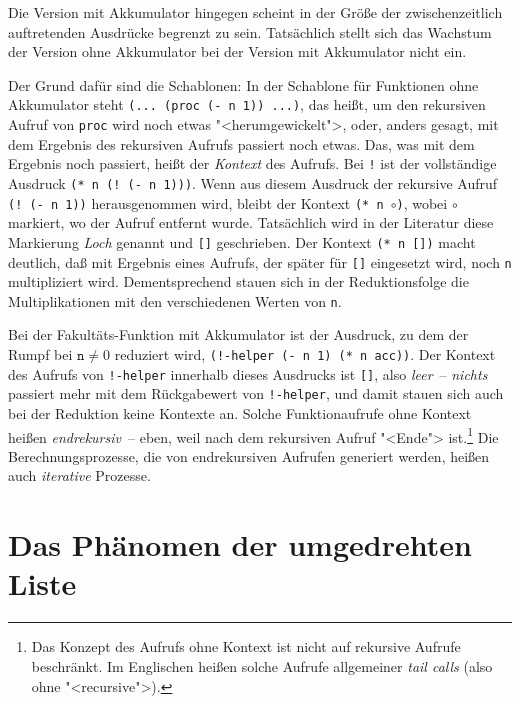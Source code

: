 Die Version mit Akkumulator hingegen scheint in der Größe der
zwischenzeitlich auftretenden Ausdrücke begrenzt zu sein.  Tatsächlich
stellt sich das Wachstum der Version ohne Akkumulator bei der Version
mit Akkumulator nicht ein.

Der Grund dafür sind die Schablonen: In der Schablone für Funktionen
ohne Akkumulator steht \texttt{(... (proc (- n 1)) ...)}, das
heißt, um den rekursiven Aufruf von \texttt{proc} wird noch
etwas "<herumgewickelt">, oder, anders gesagt, mit dem Ergebnis des
rekursiven Aufrufs passiert noch etwas.  Das, was mit dem Ergebnis
noch passiert, heißt der \textit{Kontext} des Aufrufs.
Bei \texttt{!} ist der vollständige Ausdruck \texttt{(* n (! (- n
  1)))}.  Wenn aus diesem Ausdruck der rekursive Aufruf \texttt{(! (-
  n 1))} herausgenommen wird, bleibt der Kontext \texttt{(* n
  \(\circ\))}, wobei $\circ$ markiert, wo der Aufruf entfernt
wurde.  Tatsächlich wird in der Literatur diese Markierung
\textit{Loch} genannt und \texttt{[]} geschrieben.  Der
Kontext \texttt{(* n [])} macht deutlich, daß mit Ergebnis eines
Aufrufs, der später für \texttt{[]} eingesetzt wird, noch \texttt{n}
multipliziert wird.  Dementsprechend stauen sich in der
Reduktionsfolge die Multiplikationen mit den verschiedenen Werten von
\texttt{n}.

Bei der Fakultäts-Funktion mit Akkumulator ist der Ausdruck, zu dem
der Rumpf bei $\texttt{n} \neq 0$ reduziert wird, \texttt{(!-helper (- n 1)
  (* n acc))}.  Der Kontext des Aufrufs von \texttt{!-helper} innerhalb
dieses Ausdrucks ist \texttt{[]}, also \emph{leer}~-- \emph{nichts}
passiert mehr mit dem Rückgabewert von \texttt{!-helper}, und damit stauen
sich auch bei der Reduktion keine Kontexte an.  Solche Funktionaufrufe
ohne Kontext heißen \textit{endrekursiv}~-- eben,
weil nach dem rekursiven Aufruf "<Ende"> ist.\footnote{Das Konzept des
  Aufrufs ohne Kontext ist nicht auf rekursive Aufrufe beschränkt.  Im
  Englischen heißen solche Aufrufe allgemeiner \textit{tail
    calls} (also ohne "<recursive">).}
Die Berechnungsprozesse, die von endrekursiven Aufrufen generiert
werden, heißen auch \textit{iterative} Prozesse.

\section{Das Phänomen der umgedrehten Liste}

